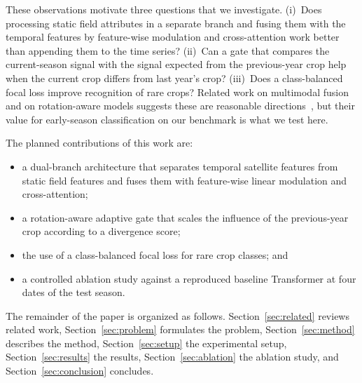 These observations motivate three questions that we investigate. (i)~Does processing static field attributes in a separate branch and fusing them with the temporal features by feature-wise modulation and cross-attention work better than appending them to the time series? (ii)~Can a gate that compares the current-season signal with the signal expected from the previous-year crop help when the current crop differs from last year's crop? (iii)~Does a class-balanced focal loss improve recognition of rare crops? Related work on multimodal fusion and on rotation-aware models suggests these are reasonable directions~\cite{barriere2024,perez2018film}, but their value for early-season classification on our benchmark is what we test here.

The planned contributions of this work are:
\begin{itemize}
\item a dual-branch architecture that separates temporal satellite features from static field features and fuses them with feature-wise linear modulation and cross-attention;
\item a rotation-aware adaptive gate that scales the influence of the previous-year crop according to a divergence score;
\item the use of a class-balanced focal loss for rare crop classes; and
\item a controlled ablation study against a reproduced baseline Transformer at four dates of the test season.
\end{itemize}

The remainder of the paper is organized as follows. Section~\ref{sec:related} reviews related work, Section~\ref{sec:problem} formulates the problem, Section~\ref{sec:method} describes the method, Section~\ref{sec:setup} the experimental setup, Section~\ref{sec:results} the results, Section~\ref{sec:ablation} the ablation study, and Section~\ref{sec:conclusion} concludes.
